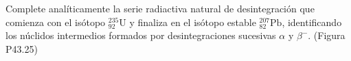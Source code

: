 \item Complete analíticamente la serie radiactiva natural de desintegración que comienza con el isótopo $^{235}_{92}\text{U}$ y finaliza en el isótopo estable $^{207}_{82}\text{Pb}$, identificando los núclidos intermedios formados por desintegraciones sucesivas $\alpha$ y $\beta^-$. (Figura P43.25)
